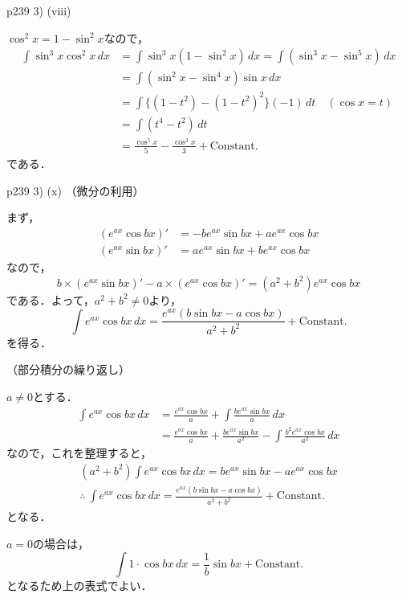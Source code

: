 \documentclass[dvipdfmx,uplatex,11pt]{jsarticle}
\theoremstyle{definition}
\begin{document}
p239 3) (viii)

\begin{leftbar}
    $\cos ^2 x = 1- \sin ^2 x$なので，
    \begin{align*}
        \int \sin ^3 x \cos ^2 x \, dx & = \int \sin ^3 x (1-\sin ^2 x) \, dx = \int (\sin ^3 x - \sin ^5 x ) \, dx \\
        & = \int (\sin ^2 x - \sin ^4 x) \sin x \, dx \\
        & = \int \{ (1-t^2)- (1-t^2)^2 \} (-1) \, dt \quad (\cos x =t) \\
        & = \int (t^4 -t^2) \, dt \\
        & = \frac{\cos ^5 x}{5}-\frac{\cos ^3 x}{3}+\mathrm{Constant.}
    \end{align*}
    である．
\end{leftbar}

\newpage 

p239 3) (x)
%
（微分の利用）
\begin{leftbar}
    まず，
    \begin{align*}
        (e^{ax} \cos bx)' &= -b e^{ax} \sin b x + a e^{ax} \cos bx \\
        (e^{ax} \sin bx)' & = a e^{ax} \sin b x + b e^{ax} \cos bx
    \end{align*}
    なので，
    \[
         b \times (e^{ax} \sin bx)'-a \times (e^{ax} \cos bx)' = (a^2+b^2) e^{ax} \cos bx
    \]
    である．よって，$a^2 + b^2 \ne 0$より，
    \[
        \int e^{ax} \cos bx \, dx  = \frac{e^{ax}(b \sin bx- a \cos bx)}{a^2+b^2} + \mathrm{Constant.}
    \]
    を得る．
\end{leftbar}

（部分積分の繰り返し）
\begin{leftbar}
    $a \ne 0$とする．
    \begin{align*}
       \int e^{ax} \cos bx \, dx & = \frac{e^{ax} \cos bx}{a} + \int \frac{b e^{ax} \sin bx}{a} \, dx \\
       & = \frac{e^{ax} \cos bx}{a} + \frac{b e^{ax} \sin bx}{a^2} - \int \frac{b^2 e^{ax} \cos bx}{a^2} \, dx
    \end{align*}
    なので，これを整理すると，
    \begin{gather*}
        (a^2 + b^2) \int e^{ax} \cos bx  \, dx = b e^{ax} \sin bx - a e^{ax} \cos bx \\
        \therefore ~ \int e^{ax} \cos bx \, dx  = \frac{e^{ax}(b \sin bx- a \cos bx)}{a^2+b^2} + \mathrm{Constant.}
    \end{gather*}
    となる．

    $a =0$の場合は，
    \[
        \int 1 \cdot \cos bx \, dx = \frac{1}{b} \sin bx + \mathrm{Constant.}
    \]
    となるため上の表式でよい．
\end{leftbar}
\end{document}
